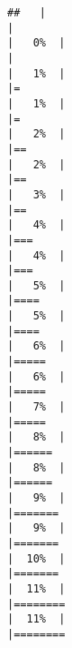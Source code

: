 \documentclass[10pt,letterpaper]{article}
\begin{document}
\begin{verbatim}
##   |                                                                              |                                                                      |   0%  |                                                                              |                                                                      |   1%  |                                                                              |=                                                                     |   1%  |                                                                              |=                                                                     |   2%  |                                                                              |==                                                                    |   2%  |                                                                              |==                                                                    |   3%  |                                                                              |==                                                                    |   4%  |                                                                              |===                                                                   |   4%  |                                                                              |===                                                                   |   5%  |                                                                              |====                                                                  |   5%  |                                                                              |====                                                                  |   6%  |                                                                              |=====                                                                 |   6%  |                                                                              |=====                                                                 |   7%  |                                                                              |=====                                                                 |   8%  |                                                                              |======                                                                |   8%  |                                                                              |======                                                                |   9%  |                                                                              |=======                                                               |   9%  |                                                                              |=======                                                               |  10%  |                                                                              |=======                                                               |  11%  |                                                                              |========                                                              |  11%  |                                                                              |========  
\end{verbatim}
\end{document}
